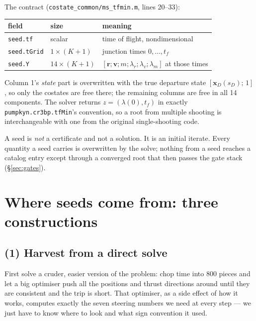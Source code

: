 \documentclass[11pt]{article}
\newcommand{\lv}{\lambda_v}\newcommand{\lr}{\lambda_r}\newcommand{\lm}{\lambda_m}
\newcommand{\tf}{t_f}\newcommand{\R}{\mathbb{R}}
\newcommand{\file}[1]{\texttt{#1}}
\newcommand{\sD}{s_D}\newcommand{\sA}{s_A}
\begin{document}
\begin{rig}
The contract (\file{costate\_common/ms\_tfmin.m}, lines 20--33):
\begin{center}
\begin{tabular}{@{}lll@{}}
\toprule
field & size & meaning \\
\midrule
\file{seed.tf}    & scalar        & time of flight, nondimensional \\
\file{seed.tGrid} & $1\times(K{+}1)$ & junction times $0,\dots,\tf$ \\
\file{seed.Y}     & $14\times(K{+}1)$ & $[\bm r;\bm v;m;\lr;\lv;\lm]$ at those times \\
\bottomrule
\end{tabular}
\end{center}
Column 1's \emph{state} part is overwritten with the true departure state
$[\bm x_D(\sD);\,1]$, so only the costates are free there; the remaining
columns are free in all 14 components. The solver returns
$z=(\lambda(0),\tf)$ in exactly \file{pumpkyn.cr3bp.tfMin}'s convention, so a
root from multiple shooting is interchangeable with one from the original
single-shooting code.
\end{rig}

\begin{warn}
A seed is \emph{not} a certificate and not a solution. It is an initial
iterate. Every quantity a seed carries is overwritten by the solve; nothing
from a seed reaches a catalog entry except through a converged root that then
passes the gate stack (\S\ref{sec:gates}).
\end{warn}

\section{Where seeds come from: three constructions}\label{sec:three}

\subsection{(1) Harvest from a direct solve}

\begin{eli}
First solve a cruder, easier version of the problem: chop time into 800
pieces and let a big optimiser push all the positions and thrust directions
around until they are consistent and the trip is short. That optimiser, as a
side effect of how it works, computes exactly the seven steering numbers we
need at every step --- we just have to know where to look and what sign
convention it used.
\end{eli}
\end{document}
